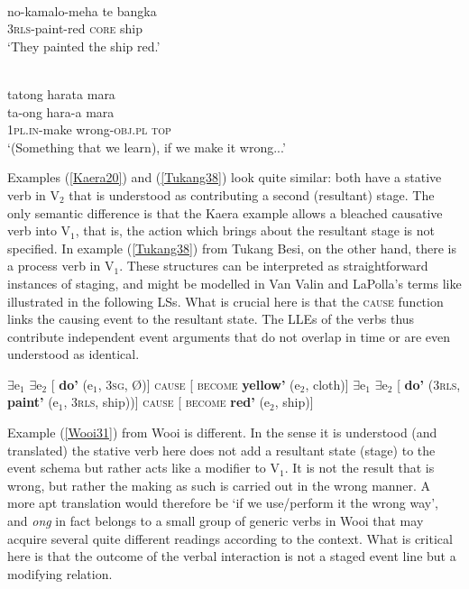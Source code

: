 \ea \label{Tukang38}
\\
\gll no-kamalo-meha te bangka \\
3\textsc{rls}-paint-red \textsc{core} ship \\
\glft `They painted the ship red.' \\ 
\z

\ea \label{Wooi31}
\\
\glll tatong harata mara \\
ta-ong hara-a mara \\
1\textsc{pl}.\textsc{in}-make wrong-\textsc{obj}.\textsc{pl} \textsc{top}\\
\glft `(Something that we learn), if we make it wrong...' \\ 
\z

Examples (\ref{Kaera20}) and (\ref{Tukang38}) look quite similar: both have a stative verb in V$_2$ that is understood as contributing a second (resultant) stage. The only semantic difference is that the Kaera example allows a bleached causative verb into V$_1$, that is, the action which brings about the resultant stage is not specified. In example (\ref{Tukang38}) from Tukang Besi, on the other hand, there is a process verb in V$_1$. These structures can be interpreted as straightforward instances of staging, and might be modelled in Van Valin and LaPolla's terms like illustrated in the following LSs. What is crucial here is that the \textsc{cause} function links the causing event to the resultant state. The LLEs of the verbs thus contribute independent event arguments that do not overlap in time or are even understood as identical.

\ea
\ea \label{Kaera20_LS} $\exists$e$_1$ $\exists$e$_2$ [ \textbf{do'} (e$_1$, 3\textsc{sg}, Ø)] \textsc{cause} [ \textsc{become} \textbf{yellow'} (e$_2$, cloth)]
\ex \label{Tukang38_LS} $\exists$e$_1$ $\exists$e$_2$ [ \textbf{do'} (3\textsc{rls}, \textbf{paint'} (e$_1$, 3\textsc{rls}, ship))] \textsc{cause} [ \textsc{become} \textbf{red'} (e$_2$, ship)]
\z
\z

Example (\ref{Wooi31}) from Wooi is different. In the sense it is understood (and translated) the stative verb here does not add a resultant state (stage) to the event schema but rather acts like a modifier to V$_1$. It is not the result that is wrong, but rather the making as such is carried out in the wrong manner. A more apt translation would therefore be `if we use/perform it the wrong way', and \textit{ong} in fact belongs to a small group of generic verbs in Wooi that may acquire several quite different readings according to the context. What is critical here is that the outcome of the verbal interaction is not a staged event line but a modifying relation. 

